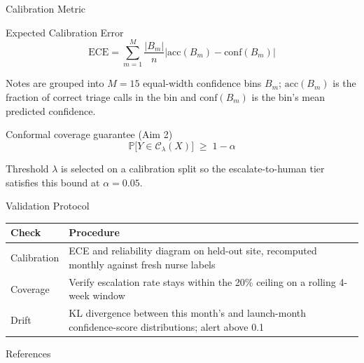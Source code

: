 \begin{frame}{Calibration Metric}
  \small
  \begin{block}{Expected Calibration Error}
    \[
      \mathrm{ECE} = \sum_{m=1}^{M} \frac{|B_m|}{n}
        \left| \mathrm{acc}(B_m) - \mathrm{conf}(B_m) \right|
    \]
  \end{block}
  \par\vspace{2pt}
  Notes are grouped into $M{=}15$ equal-width confidence bins $B_m$;
  $\mathrm{acc}(B_m)$ is the fraction of correct triage calls in the bin
  and $\mathrm{conf}(B_m)$ is the bin's mean predicted confidence.
  \par\vspace{4pt}
  \begin{block}{Conformal coverage guarantee (Aim 2)}
    \[
      \mathbb{P}\big[Y \in \mathcal{C}_\lambda(X)\big] \;\geq\; 1 - \alpha
    \]
  \end{block}
  Threshold $\lambda$ is selected on a calibration split so the
  escalate-to-human tier satisfies this bound at $\alpha = 0.05$.
\end{frame}

\begin{frame}{Validation Protocol}
  \begin{table}
    \centering
    \small
    \begin{tabular}{lp{6.6cm}}
      \toprule
      \textbf{Check} & \textbf{Procedure} \\
      \midrule
      Calibration & ECE and reliability diagram on held-out site,
        recomputed monthly against fresh nurse labels \\
      \addlinespace
      Coverage & Verify escalation rate stays within the 20\% ceiling on
        a rolling 4-week window \\
      \addlinespace
      Drift & KL divergence between this month's and launch-month
        confidence-score distributions; alert above 0.1 \\
      \bottomrule
    \end{tabular}
  \end{table}
\end{frame}

\begin{frame}[allowframebreaks]{References}
  \printbibliography
\end{frame}
